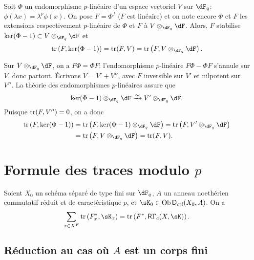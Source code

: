 \begin{lemma_}\label{III:3-8}
Soit $\Phi$ un endomorphisme $p$-linéaire d'un espace vectoriel $V$ sur 
$\dF_q$: $\phi(\lambda x) = \lambda^p\phi(x)$. On pose $F=\Phi^f$ ($F$ est 
linéaire) et on note encore $\Phi$ et $F$ les extensions respectivement 
$p$-linéaire de $\Phi$ et $F$ à $V\otimes_{\dF_q}\dF$. Alors, $F$ stabilise 
$\ker(\Phi-1)\subset V\otimes_{\dF_q}\dF$ et 
\[
  \tr\left(F,\ker(\Phi-1)\right) = \tr(F,V) = \tr\left(F,V\otimes_{\dF_q}\dF\right) \text{.}
\]
\end{lemma_}

Sur $V\otimes_{\dF_q}\dF$, on a $F\Phi = \Phi F$: l'endomorphisme $p$-linéaire 
$F\Phi-\Phi F$ s'annule sur $V$, donc partout. Écrivons $V=V'+V''$, avec $F$ 
inversible sur $V'$ et nilpotent sur $V''$. La théorie des endomorphismes 
$p$-linéaires assure que 
\[
  \ker(\Phi-1)\otimes_{\dF_q}\dF \iso V'\otimes_{\dF_q}\dF \text{.}
\]
Puisque $\operatorname{tr}(F,V'') = 0$, on a donc 
\begin{align*}
  \tr\left(F,\ker(\Phi-1)\right) 
    &= \tr\left(F,\ker(\Phi-1)\otimes_{\dF_q}\dF\right) = \tr\left(F,V'\otimes_{\dF_q}\dF\right) \\
    &= \tr\left(F,V\otimes_{\dF_q}\dF\right) = \tr(F,V) \text{.}
\end{align*}










\section{Formule des traces modulo \texorpdfstring{$p$}{p}}\label{III:4}





\begin{theorem_}\label{III:4-1}
Soient $X_0$ un schéma séparé de type fini sur $\dF_q$, $A$ un anneau 
noethérien commutatif réduit et de caractéristique $p$, et 
$\sK_0\in\ob\D_\textnormal{ctf}(X_0,A)$. On a 
\begin{equation}\label{III:eq:4-1-1}
  \sum_{x\in X^F} \tr\left(F_x^*,\sK_x\right) = \tr\left(F^*,\R\Gamma_c(X,\sK)\right) \text{.}
\end{equation}
\end{theorem_}





\subsection{Réduction au cas où \texorpdfstring{$A$}{A} est un corps fini}\label{III:4-2}

